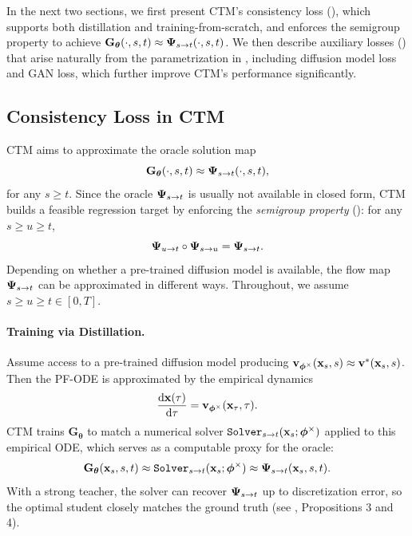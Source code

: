 In the next two sections, we first present CTM's consistency loss
(), which supports both distillation and
training-from-scratch, and enforces the semigroup property to achieve
$\mathbf{G}_{\bm{\theta}}(\cdot, s, t) \approx {\bm{\Psi}}_{s\to t}(\cdot, s, t)$.
We then describe auxiliary losses () that arise
naturally from the parametrization in , including diffusion model loss and
GAN loss, which further improve CTM's performance significantly.


\subsection{Consistency Loss in CTM}\label{subsec:ctm-consistency}
CTM aims to approximate the oracle solution map
\[
\mathbf{G}_{\bm{\theta}}(\cdot, s, t) \approx {\bm{\Psi}}_{s\to t}(\cdot, s, t),
\]
for any $s \ge t$. Since the oracle ${\bm{\Psi}}_{s\to t}$ is usually not available in
closed form, CTM builds a feasible regression target by enforcing the
\emph{semigroup property} (): for any $s \ge u \ge t$,
\[
{\bm{\Psi}}_{u\to t}\circ {\bm{\Psi}}_{s\to u} = {\bm{\Psi}}_{s\to t}.
\]
Depending on whether a pre-trained diffusion model is available,
the flow map ${\bm{\Psi}}_{s\to t}$ can be approximated in different ways.
Throughout, we assume $s \ge u \ge t \in [0,T]$.


\paragraph{Training via Distillation.}
Assume access to a pre-trained diffusion model producing
${\mathbf{v}}_{\bm{\phi}^\times}({\mathbf{x}}_s, s) \approx {\mathbf{v}}^*({\mathbf{x}}_s, s)$. Then the
PF-ODE is approximated by the empirical dynamics
\begin{align}
\frac{\mathop{}\!\mathrm{d} {\mathbf{x}}(\tau)}{\mathop{}\!\mathrm{d} \tau}
= {\mathbf{v}}_{\bm{\phi}^\times}({\mathbf{x}}_\tau, \tau).
\end{align}
CTM trains $\mathbf{G}_{\bm{\theta}}$ to match a numerical solver
$\mathtt{Solver}_{s\to t}({\mathbf{x}}_s;\bm{\phi}^\times)$ applied to this empirical
ODE, which serves as a computable proxy for the oracle:
\[
\mathbf{G}_{\bm{\theta}}({\mathbf{x}}_s, s, t)
\approx \mathtt{Solver}_{s\to t}({\mathbf{x}}_s;\bm{\phi}^\times)
\approx {\bm{\Psi}}_{s\to t}({\mathbf{x}}_s, s, t).
\]
With a strong teacher, the solver can recover ${\bm{\Psi}}_{s\to t}$ up to
discretization error, so the optimal student closely matches the ground truth
(see \citep{kim2023consistency}, Propositions 3 and 4).

